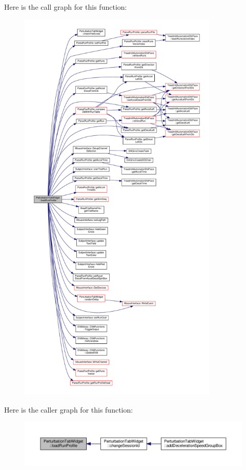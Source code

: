 Here is the call graph for this function\+:
\nopagebreak
\begin{figure}[H]
\begin{center}
\leavevmode
\includegraphics[height=550pt]{class_perturbation_tab_widget_aeecb373be32ddc6ea3c165d685b2a386_cgraph}
\end{center}
\end{figure}
Here is the caller graph for this function\+:
\nopagebreak
\begin{figure}[H]
\begin{center}
\leavevmode
\includegraphics[width=350pt]{class_perturbation_tab_widget_aeecb373be32ddc6ea3c165d685b2a386_icgraph}
\end{center}
\end{figure}
\mbox{\label{class_perturbation_tab_widget_a09c65ab9737d61975cebc94fe843482d}} 
